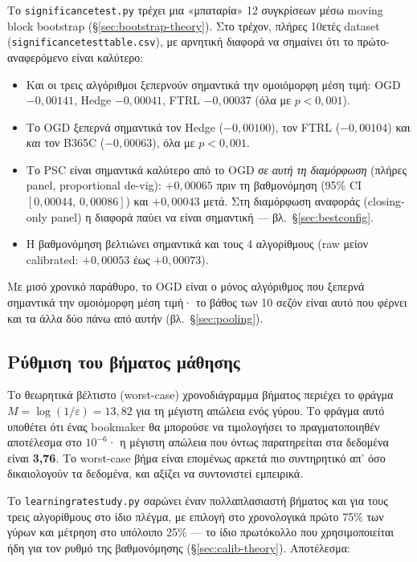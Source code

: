 \documentclass[11pt,a4paper]{article}
\newcommand{\file}[1]{\texttt{#1}}
\renewcommand{\_}{\oldunderscore\allowbreak}
\begin{document}
Το \file{significance\_test.py} τρέχει μια «μπαταρία» 12 συγκρίσεων μέσω moving block
bootstrap (\S\ref{sec:bootstrap-theory}). Στο τρέχον, πλήρες 10ετές dataset
(\file{significance\_test\_table.csv}), με αρνητική διαφορά να σημαίνει ότι το πρώτο-αναφερόμενο
είναι καλύτερο:
\begin{itemize}
  \item Και οι τρεις αλγόριθμοι ξεπερνούν σημαντικά την ομοιόμορφη μέση τιμή: OGD
        $-0{,}00141$, Hedge $-0{,}00041$, FTRL $-0{,}00037$ (όλα με $p<0{,}001$).
  \item Το OGD ξεπερνά σημαντικά τον Hedge ($-0{,}00100$), τον FTRL ($-0{,}00104$) και
        \emph{και} τον B365C ($-0{,}00063$), όλα με $p<0{,}001$.
  \item Το PSC είναι σημαντικά καλύτερο από το OGD \emph{σε αυτή τη διαμόρφωση} (πλήρες
        panel, proportional de-vig): $+0{,}00065$ πριν τη βαθμονόμηση
        (95\% CI $[0{,}00044,\,0{,}00086]$) και $+0{,}00043$ μετά. Στη διαμόρφωση αναφοράς
        (closing-only panel) η διαφορά παύει να είναι σημαντική --- βλ.\
        \S\ref{sec:bestconfig}.
  \item Η βαθμονόμηση βελτιώνει σημαντικά και τους 4 αλγορίθμους (raw μείον calibrated:
        $+0{,}00053$ έως $+0{,}00073$).
\end{itemize}
Με μισό χρονικό παράθυρο, το OGD είναι ο μόνος αλγόριθμος που ξεπερνά σημαντικά την
ομοιόμορφη μέση τιμή· το βάθος των 10 σεζόν είναι αυτό που φέρνει και τα άλλα δύο πάνω από
αυτήν (βλ.\ \S\ref{sec:pooling}).

\subsection{Ρύθμιση του βήματος μάθησης}
\label{sec:steptuning}

Το θεωρητικά βέλτιστο (worst-case) χρονοδιάγραμμα βήματος περιέχει το φράγμα
$M=\log(1/\varepsilon)=13{,}82$ για τη μέγιστη απώλεια ενός γύρου. Το φράγμα αυτό υποθέτει
ότι ένας bookmaker θα μπορούσε να τιμολογήσει το πραγματοποιηθέν αποτέλεσμα στο $10^{-6}$·
η μέγιστη απώλεια που όντως παρατηρείται στα δεδομένα είναι \textbf{3{,}76}. Το worst-case
βήμα είναι επομένως αρκετά πιο συντηρητικό απ' όσο δικαιολογούν τα δεδομένα, και αξίζει να
συντονιστεί εμπειρικά.

Το \file{learning\_rate\_study.py} σαρώνει έναν πολλαπλασιαστή βήματος και για τους τρεις
αλγορίθμους στο ίδιο πλέγμα, με επιλογή στο χρονολογικά πρώτο 75\% των γύρων και μέτρηση στο
υπόλοιπο 25\% --- το ίδιο πρωτόκολλο που χρησιμοποιείται ήδη για τον ρυθμό της βαθμονόμησης
(\S\ref{sec:calib-theory}). Αποτέλεσμα:
\end{document}
